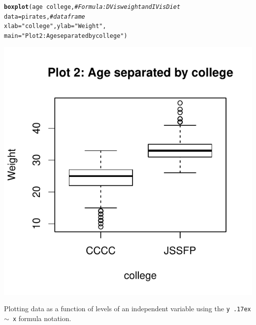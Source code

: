 \documentclass{tufte-book}\usepackage[]{graphicx}\usepackage[]{color}
\makeatletter
\def\maxwidth{ %
  \ifdim\Gin@nat@width>\linewidth
    \linewidth
  \else
    \Gin@nat@width
  \fi
}
\newcommand{\hlstr}[1]{\textcolor[rgb]{0.192,0.494,0.8}{#1}}%
\newcommand{\hlcom}[1]{\textcolor[rgb]{0.678,0.584,0.686}{\textit{#1}}}%
\newcommand{\hlopt}[1]{\textcolor[rgb]{0,0,0}{#1}}%
\newcommand{\hlstd}[1]{\textcolor[rgb]{0.345,0.345,0.345}{#1}}%
\newcommand{\hlkwc}[1]{\textcolor[rgb]{0.333,0.667,0.333}{#1}}%
\newcommand{\hlkwd}[1]{\textcolor[rgb]{0.737,0.353,0.396}{\textbf{#1}}}%
\newenvironment{kframe}{%
 \def\at@end@of@kframe{}%
 \ifinner\ifhmode%
  \def\at@end@of@kframe{\end{minipage}}%
  \begin{minipage}{\columnwidth}%
 \fi\fi%
 \def\FrameCommand##1{\hskip\@totalleftmargin \hskip-\fboxsep
 \colorbox{shadecolor}{##1}\hskip-\fboxsep
     \hskip-\linewidth \hskip-\@totalleftmargin \hskip\columnwidth}%
 \MakeFramed {\advance\hsize-\width
   \@totalleftmargin\z@ \linewidth\hsize
   \@setminipage}}%
 {\par\unskip\endMakeFramed%
 \at@end@of@kframe}
\newenvironment{knitrout}{}{} %
\makeatother
\begin{document}
\begin{footnotesize}
\begin{marginfigure}
\begin{tiny}
\begin{knitrout}
\color{fgcolor}\begin{kframe}
\begin{alltt}
\hlkwd{boxplot}\hlstd{(age} \hlopt{~} \hlstd{college,} \hlcom{# Formula: DV is weight and IV is Diet}
        \hlkwc{data} \hlstd{= pirates,} \hlcom{# dataframe}
        \hlkwc{xlab} \hlstd{=} \hlstr{"college"}\hlstd{,} \hlkwc{ylab} \hlstd{=} \hlstr{"Weight"}\hlstd{,}
        \hlkwc{main} \hlstd{=} \hlstr{"Plot 2: Age separated by college"}\hlstd{)}
\end{alltt}
\end{kframe}
\includegraphics[width=\maxwidth]{figure/unnamed-chunk-147-1} 

\end{knitrout}
\end{tiny}
\caption{Plotting data as a function of levels of an independent variable using the \texttt{y {\raise.17ex\hbox{$\scriptstyle\sim$}} x} formula notation.}
\label{fig:boxplot2}
\end{marginfigure}



\vspace{5mm} %
\noindent
\setlength{\fboxrule}{1.5pt}
\fbox{
\parbox{\textwidth}{

}}
\end{footnotesize}
\end{document}
